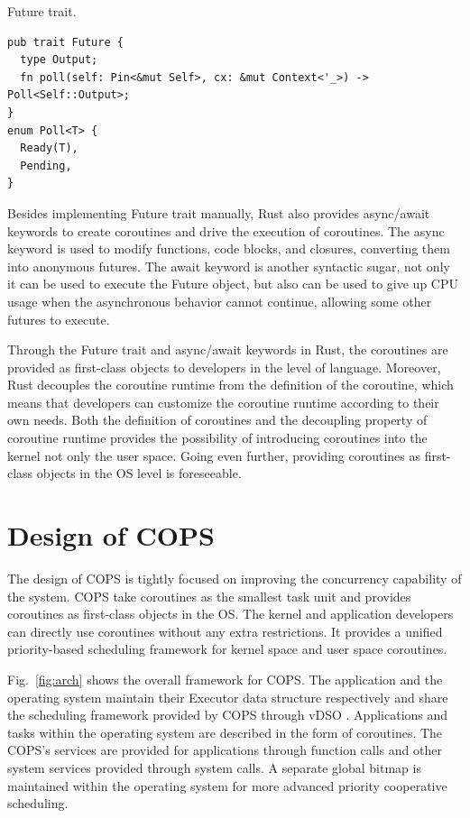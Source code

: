 \documentclass[sigconf,review,anonymous]{acmart}
\begin{document}
\begin{listing}[ht]
\caption{Future trait.}
\label{future_trait}
\begin{mdframed}
\begin{verbatim}
pub trait Future {
  type Output;
  fn poll(self: Pin<&mut Self>, cx: &mut Context<'_>) -> Poll<Self::Output>;
}
enum Poll<T> {
  Ready(T),
  Pending,
}
\end{verbatim}
\end{mdframed}
\end{listing}

Besides implementing Future trait manually, Rust also provides async/await keywords to create coroutines and drive the execution of coroutines. The async keyword is used to modify functions, code blocks, and closures, converting them into anonymous futures. The await keyword is another syntactic sugar, not only it can be used to execute the Future object, but also can be used to give up CPU usage when the asynchronous behavior cannot continue, allowing some other futures to execute.

Through the Future trait and async/await keywords in Rust, the coroutines are provided as first-class objects to developers in the level of language. Moreover, Rust decouples the coroutine runtime from the definition of the coroutine, which means that developers can customize the coroutine runtime according to their own needs. Both the definition of coroutines and the decoupling property of coroutine runtime provides the possibility of introducing coroutines into the kernel not only the user space. Going even further, providing coroutines as first-class objects in the OS level is foreseeable.

\section{Design of COPS}
\label{section: design}

The design of COPS is tightly focused on improving the concurrency capability of the system. COPS take coroutines as the smallest task unit and provides coroutines as first-class objects in the OS. The kernel and application developers can directly use coroutines without any extra restrictions. It provides a unified priority-based scheduling framework for kernel space and user space coroutines. 

Fig.~\ref{fig:arch} shows the overall framework for COPS. The application and the operating system maintain their Executor data structure respectively and share the scheduling framework provided by COPS through vDSO \cite{michael_kerrisk_vdso7_2023}. Applications and tasks within the operating system are described in the form of coroutines. The COPS's services are provided for applications through function calls and other system services provided through system calls. A separate global bitmap is maintained within the operating system for more advanced priority cooperative scheduling.
\end{document}

